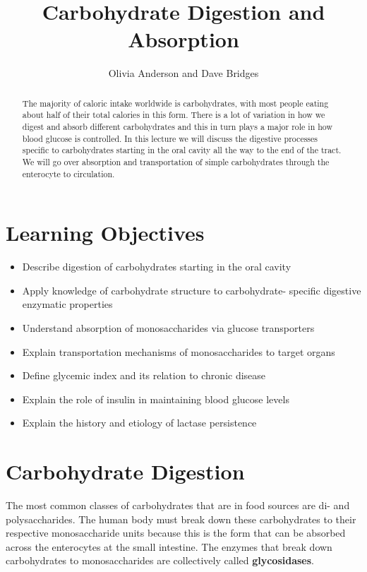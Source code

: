 \documentclass{tufte-handout}
\title{Carbohydrate Digestion and Absorption}
\author{Olivia Anderson and Dave Bridges}
\date{}  %
\begin{document}
\maketitle%

\begin{abstract}
The majority of caloric intake worldwide is carbohydrates, with most people eating about half of their total calories in this form.  There is a lot of variation in how we digest and absorb different carbohydrates and this in turn plays a major role in how blood glucose is controlled.  In this lecture we will discuss the digestive processes specific to carbohydrates starting in the oral cavity all the way to the end of the tract. We will go over absorption and transportation of simple carbohydrates through the enterocyte to circulation.
\end{abstract}

\tableofcontents


\pagebreak


\section{Learning Objectives}

\begin{itemize}
\item Describe digestion of carbohydrates starting in the oral cavity
\item Apply knowledge of carbohydrate structure to carbohydrate- specific digestive enzymatic properties
\item Understand absorption of monosaccharides via glucose transporters
\item Explain transportation mechanisms of monosaccharides to target organs
\item Define glycemic index and its relation to chronic disease
\item Explain the role of insulin in maintaining blood glucose levels
\item Explain the history and etiology of lactase persistence
\end{itemize}


\section{Carbohydrate Digestion}\label{carbohydrate-digestion}

The most common classes of carbohydrates that are in food sources are di- and polysaccharides. The human body must break down these carbohydrates to their respective monosaccharide units because this is the form that can be absorbed across the enterocytes at the small intestine. The enzymes that break down carbohydrates to monosaccharides are collectively called \textbf{glycosidases}.
\end{document}
